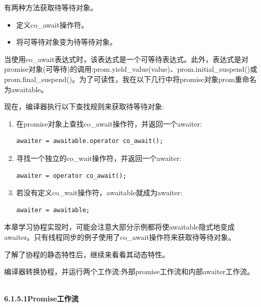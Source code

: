 有两种方法获取待等待对象。

\begin{itemize}
\item 
定义co\_await操作符。

\item 
将可等待对象变为待等待对象。
\end{itemize}

当使用co\_await表达式时，该表达式是一个可等待表达式。此外，表达式是对promise对象(可等待)的调用:prom.yield\_value(value)、prom.initial\_suspend()或prom.final\_suspend()。为了可读性，我在以下几行中将promise对象prom重命名为awaitable。

现在，编译器执行以下查找规则来获取待等待对象:

\begin{enumerate}
\item 
在promise对象上查找co\_await操作符，并返回一个awaiter:
\begin{lstlisting}[style=styleCXX]
awaiter = awaitable.operator co_await();
\end{lstlisting}

\item 
寻找一个独立的co\_wait操作符，并返回一个awaiter:
\begin{lstlisting}[style=styleCXX]
awaiter = operator co_await();
\end{lstlisting}

\item 
若没有定义co\_wait操作符，awaitable就成为awaiter:
\begin{lstlisting}[style=styleCXX]
awaiter = awaitable;
\end{lstlisting}
\end{enumerate}

\begin{tcolorbox}[breakable,enhanced jigsaw,colback=blue!5!white,colframe=blue!75!black,title={awaiter = awaitable}]
本章学习协程实现时，可能会注意大部分示例都将使awaitable隐式地变成awaiter。只有线程同步的例子使用了co\_await操作符来获取待等待对象。
\end{tcolorbox}

了解了协程的静态特性后，继续来看看其动态特性。


编译器转换协程，并运行两个工作流:外部promise工作流和内部awaiter工作流。

\hspace*{\fill} \\ %
\noindent
\textbf{6.1.5.1\hspace{0.2cm}Promise工作流}

